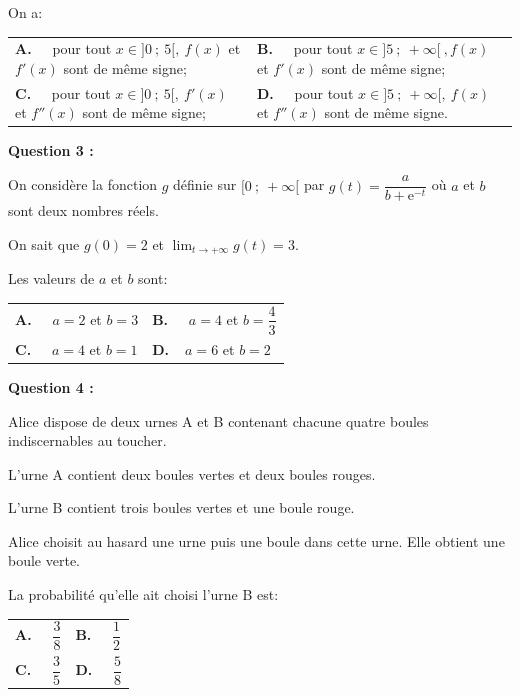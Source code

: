On a:

\begin{center}
\begin{tabularx}{\linewidth}{X X}
\textbf{A.~~} pour tout $x \in  ]0~;~5[,\:f(x)$ et $f'(x)$ sont de même signe;&
\textbf{B.~~} pour tout $x \in ]5~;~+\infty[\:, f(x)$ et $f'(x)$ sont de même signe;\\
\textbf{C.~~} pour tout $x \in ]0~;~5[,\: f'(x)$ et $f''(x)$ sont de même signe;&
\textbf{D.~~} pour tout $x \in  ]5~;~+\infty[,\: f(x)$ et $f''(x)$ sont de même signe.
\end{tabularx}
\end{center}

\medskip

\textbf{Question 3 :}

\medskip

On considère la fonction $g$ définie sur $[0~;~ +\infty[$ par $g(t) = \dfrac{a}{b + \text{e}^{-t}}$ où $a$ et $b$ sont deux nombres réels.

On sait que $g(0) = 2$ et $\displaystyle\lim_{t \to + \infty}  g(t) = 3$. 

Les valeurs de $a$ et $b$ sont:

\begin{center}
\begin{tabularx}{\linewidth}{X X}
\textbf{A.~~} $a = 2$ et $b = 3$&\textbf{B.~~} $a = 4$ et $b = \dfrac43$\\
\textbf{C.~~} $a = 4$ et $b = 1$&\textbf{D.~~}$a = 6$ et $b = 2$
\end{tabularx}
\end{center}

\medskip

\textbf{Question 4 :}

\medskip

Alice dispose de deux urnes A et B contenant chacune quatre boules indiscernables au toucher.

L'urne A contient deux boules vertes et deux boules rouges.

L'urne B contient trois boules vertes et une boule rouge.

Alice choisit au hasard une urne puis une boule dans cette urne. Elle obtient une boule verte.

La probabilité qu'elle ait choisi l'urne B est:

\begin{center}
\renewcommand\arraystretch{2.1}
\begin{tabularx}{\linewidth}{X X}
\textbf{A.~~} $\dfrac38$&\textbf{B.~~} $\dfrac12$\\
\textbf{C.~~} $\dfrac35$&\textbf{D.~~} $\dfrac58$
\end{tabularx}
\end{center}
\renewcommand\arraystretch{1}

